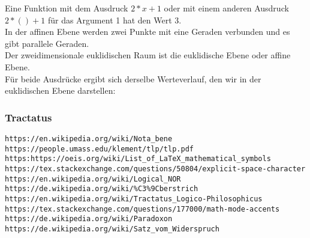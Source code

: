\documentclass[10pt,a4paper]{article}
\begin{document}
Eine Funktion mit dem Ausdruck $2 \ast x + 1$ oder mit einem anderen Ausdruck 
$2 \ast () + 1$ für das Argument 1 hat den Wert $3$. \\

In der affinen Ebene werden zwei Punkte mit eine Geraden verbunden und es gibt
parallele Geraden. \\

Der zweidimensionale euklidischen Raum ist die euklidische Ebene oder affine
Ebene. \\

Für beide Ausdrücke ergibt sich derselbe Werteverlauf, den wir in der euklidischen Ebene
darstellen: \\

\vskip 8pt

\subsubsection{Tractatus}

\verb+https://en.wikipedia.org/wiki/Nota_bene+ \\
\verb+https://people.umass.edu/klement/tlp/tlp.pdf+ \\
\verb+https:https://oeis.org/wiki/List_of_LaTeX_mathematical_symbols+ \\
\verb+https://tex.stackexchange.com/questions/50804/explicit-space-character+ \\
\verb+https://en.wikipedia.org/wiki/Logical_NOR+ \\
\verb+https://de.wikipedia.org/wiki/%C3%9Cberstrich+ \\
\verb+https://en.wikipedia.org/wiki/Tractatus_Logico-Philosophicus+ \\
\verb+https://tex.stackexchange.com/questions/177000/math-mode-accents+ \\

\verb+https://de.wikipedia.org/wiki/Paradoxon+ \\
\verb+https://de.wikipedia.org/wiki/Satz_vom_Widerspruch+ \\
\end{document}

